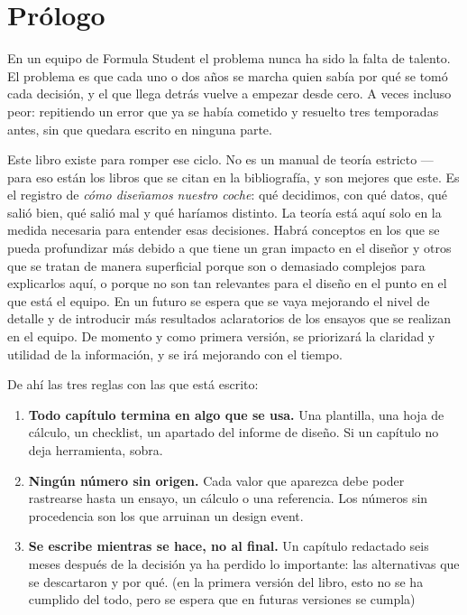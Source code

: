 \chapter*{Prólogo}

En un equipo de Formula Student el problema nunca ha sido la falta de talento.
El problema es que cada uno o dos años se marcha quien sabía por qué se tomó
cada decisión, y el que llega detrás vuelve a empezar desde cero. A veces incluso
peor: repitiendo un error que ya se había cometido y resuelto tres temporadas
antes, sin que quedara escrito en ninguna parte.

Este libro existe para romper ese ciclo. No es un manual de teoría estricto --- para eso
están los libros que se citan en la bibliografía, y son mejores que este. Es el
registro de \emph{cómo diseñamos nuestro coche}: qué decidimos, con qué datos,
qué salió bien, qué salió mal y qué haríamos distinto. La teoría está aquí solo
en la medida necesaria para entender esas decisiones. Habrá conceptos en los que se pueda
profundizar más debido a que tiene un gran impacto en el diseñor y otros que se tratan de
manera superficial porque son o demasiado complejos para explicarlos aquí, o porque no son
tan relevantes para el diseño en el punto en el que está el equipo. En un futuro se espera
que se vaya mejorando el nivel de detalle y de introducir más resultados aclaratorios de
los ensayos que se realizan en el equipo. De momento y como primera versión, se priorizará
la claridad y utilidad de la información, y se irá mejorando con el tiempo.

De ahí las tres reglas con las que está escrito:

\begin{enumerate}
  \item \textbf{Todo capítulo termina en algo que se usa.} Una plantilla, una
        hoja de cálculo, un checklist, un apartado del informe de diseño. Si un
        capítulo no deja herramienta, sobra.
  \item \textbf{Ningún número sin origen.} Cada valor que aparezca debe poder
        rastrearse hasta un ensayo, un cálculo o una referencia. Los números sin
        procedencia son los que arruinan un design event.
  \item \textbf{Se escribe mientras se hace, no al final.} Un capítulo redactado
        seis meses después de la decisión ya ha perdido lo importante: las
        alternativas que se descartaron y por qué. (en la primera versión del libro, 
        esto no se ha cumplido del todo, pero se espera que en futuras versiones se 
        cumpla)
\end{enumerate}

